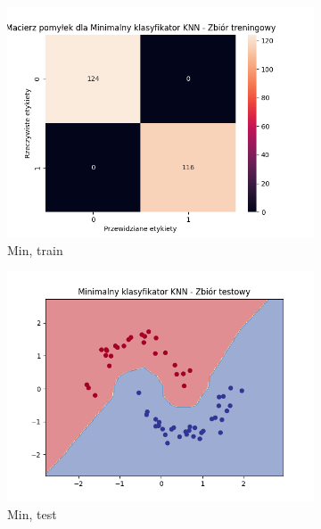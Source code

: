 \documentclass[12pt]{article}
\newcommand*{\subfigwidth}{0.24\textwidth}
\begin{document}
\begin{figure}[H]
\begin{subfigure}[t]{\subfigwidth}
        \includegraphics[width=\linewidth]{img/exp_2/knn/2_2/min/train_matrix.png}
        \caption{Min, train}
    \end{subfigure}
    \hfill
    \begin{subfigure}[t]{\subfigwidth}
        \includegraphics[width=\linewidth]{img/exp_2/knn/2_2/min/test_boundary.png}
        \caption{Min, test}
    \end{subfigure}
    \hfill
    \begin{subfigure}[t]{\subfigwidth}

\end{subfigure}
\end{figure}
\end{document}
